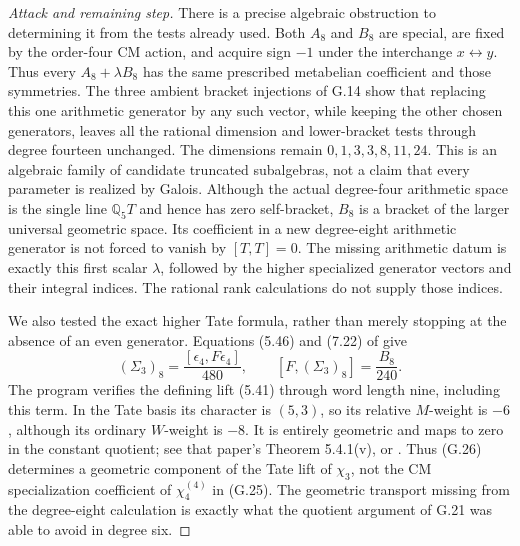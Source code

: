 \begin{proof}[Attack and remaining step]
There is a precise algebraic obstruction to determining it from
the tests already used. Both $A_8$ and $B_8$ are special, are
fixed by the order-four CM action, and acquire sign $-1$ under
the interchange $x\leftrightarrow y$. Thus every
$A_8+\lambda B_8$ has the same prescribed metabelian coefficient
and those symmetries. The three ambient bracket injections of
G.14 show that replacing this one arithmetic generator by any
such vector, while keeping the other chosen generators, leaves
all the rational dimension and lower-bracket tests through
degree fourteen unchanged. The dimensions remain
$0,1,3,3,8,11,24$. This is an algebraic family of candidate
truncated subalgebras, not a claim that every parameter is
realized by Galois. Although the actual degree-four arithmetic
space is the single line $\mathbb Q_5T$ and hence has zero
self-bracket, $B_8$ is a bracket of the larger universal
geometric space. Its coefficient in a new degree-eight
arithmetic generator is not forced to vanish by
$[T,T]=0$. The missing arithmetic datum is exactly this first
scalar $\lambda$, followed by the higher specialized generator
vectors and their integral indices.
The rational rank calculations do not supply those indices.

We also tested the exact higher Tate formula, rather than merely
stopping at the absence of an even generator. Equations (5.46)
and (7.22) of \citet{DorigoniEtAl2026} give
\[
       (\Sigma_3)_8=\frac{[\epsilon_4,F\epsilon_4]}{480},
       \qquad [F,(\Sigma_3)_8]=\frac{B_8}{240}.
       \tag{G.26}
\]
The program verifies the defining lift (5.41) through word length
nine, including this term. In the Tate basis its character is
$(5,3)$, so its relative $M$-weight is $-6$, although its
ordinary $W$-weight is $-8$. It is entirely geometric and maps
to zero in the constant quotient; see that paper's
Theorem 5.4.1(v), or
\citet[Proposition 29.1]{HainMatsumoto2020}.
Thus (G.26) determines a geometric component of the Tate lift
of $\chi_3$, not the CM specialization coefficient of
$\chi^{(4)}_4$ in (G.25). The geometric transport missing from
the degree-eight calculation is exactly what the quotient
argument of G.21 was able to avoid in degree six.


\end{proof}

